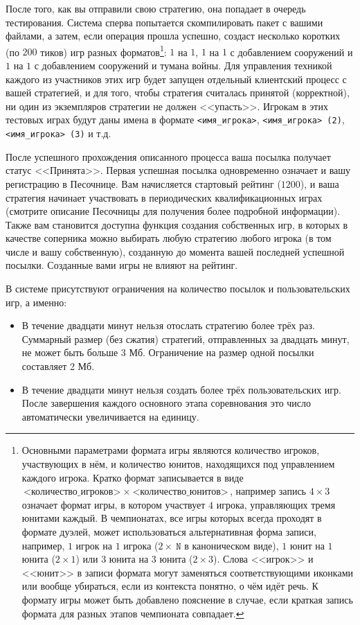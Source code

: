 После того, как вы отправили свою стратегию, она попадает в очередь тестирования. Система сперва попытается скомпилировать пакет с вашими
файлами, а затем, если операция прошла успешно, создаст несколько коротких (по $200$ тиков) игр разных форматов\footnote[6]{Основными
параметрами формата игры являются количество игроков, участвующих в нём, и количество юнитов, находящихся под управлением каждого игрока.
Кратко формат записывается в виде $\texttt{<количество\_игроков>}~\times~\texttt{<количество\_юнитов>}$, например запись $4\times3$ означает
формат игры, в котором участвует $4$ игрока, управляющих тремя юнитами каждый. В чемпионатах, все игры которых всегда проходят в формате
дуэлей, может использоваться альтернативная форма записи, например, $1$ игрок на $1$ игрока ($2\times~\texttt{N}$ в каноническом виде), $1$
юнит на $1$ юнита ($2\times1$) или $3$ юнита на $3$ юнита ($2\times3$). Слова <<игрок>> и <<юнит>> в записи формата могут заменяться
соответствующими иконками или вообще убираться, если из контекста понятно, о чём идёт речь. К формату игры может быть добавлено пояснение в
случае, если краткая запись формата для разных этапов чемпионата совпадает.}: $1$ на $1$, $1$ на $1$ с добавлением сооружений и $1$ на $1$ с
добавлением сооружений и тумана войны. Для управления техникой каждого из участников этих игр будет запущен отдельный клиентский процесс с
вашей стратегией, и для того, чтобы стратегия считалась принятой (корректной), ни один из экземпляров стратегии не должен <<упасть>>.
Игрокам в этих тестовых играх будут даны имена в формате \texttt{<имя\_игрока>}, \texttt{<имя\_игрока> (2)}, \texttt{<имя\_игрока> (3)} и
т.д.

После успешного прохождения описанного процесса ваша посылка получает статус <<Принята>>. Первая успешная посылка одновременно означает и
вашу регистрацию в Песочнице. Вам начисляется стартовый рейтинг ($1200$), и ваша стратегия начинает участвовать в периодических
квалификационных играх (смотрите описание Песочницы для получения более подробной информации). Также вам становится доступна функция
создания собственных игр, в которых в качестве соперника можно выбирать любую стратегию любого игрока (в том числе и вашу собственную),
созданную до момента вашей последней успешной посылки. Созданные вами игры не влияют на рейтинг.

В системе присутствуют ограничения на количество посылок и пользовательских игр, а именно:
\vspace{-0.15in}
\begin{itemize}
  \item В течение двадцати минут нельзя отослать стратегию более трёх раз. Суммарный размер (без сжатия) стратегий, отправленных за двадцать
        минут, не может быть больше 3 Мб. Ограничение на размер одной посылки составляет 2 Мб.
\vspace{-0.10in}
  \item В течение двадцати минут нельзя создать более трёх пользовательских игр. После завершения каждого основного этапа соревнования это
        число автоматически увеличивается на единицу.
\vspace{-0.10in}
\end{itemize}

